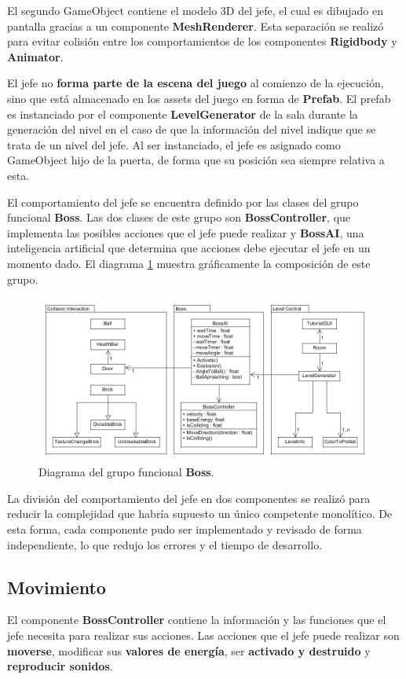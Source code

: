 El segundo GameObject contiene el modelo 3D del jefe, el cual es dibujado en pantalla gracias a un componente \textbf{MeshRenderer}. Esta separación se realizó para evitar colisión entre los comportamientos de los componentes \textbf{Rigidbody} y \textbf{Animator}.

El jefe no \textbf{forma parte de la escena del juego} al comienzo de la ejecución, sino que está almacenado en los assets del juego en forma de \textbf{Prefab}. El prefab es instanciado por el componente \textbf{LevelGenerator} de la sala durante la generación del nivel en el caso de que la información del nivel indique que se trata de un nivel del jefe. Al ser instanciado, el jefe es asignado como GameObject hijo de la puerta, de forma que su posición sea siempre relativa a esta.

El comportamiento del jefe se encuentra definido por las clases del grupo funcional \textbf{Boss}. Las dos clases de este grupo son \textbf{BossController}, que implementa las posibles acciones que el jefe puede realizar y \textbf{BossAI}, una inteligencia artificial que determina que acciones debe ejecutar el jefe en un momento dado. El diagrama \ref{diagrama_clases_jefe} muestra gráficamente la composición de este grupo.
\begin{figure}[!t]
   \centering
   \includegraphics[width=1\textwidth]{images/estructura/jefe/class_diagram}
   \caption{Diagrama del grupo funcional \textbf{Boss}.}
   \label{diagrama_clases_jefe}
\end{figure}

La división del comportamiento del jefe en dos componentes se realizó para reducir la complejidad que habría supuesto un único competente monolítico. De esta forma, cada componente pudo ser implementado y revisado de forma independiente, lo que redujo los errores y el tiempo de desarrollo. 

\subsection{Movimiento}
El componente \textbf{BossController} contiene la información y las funciones que el jefe necesita para realizar sus acciones. Las acciones que el jefe puede realizar son \textbf{moverse}, modificar sus \textbf{valores de energía}, ser \textbf{activado y destruido} y \textbf{reproducir sonidos}.

